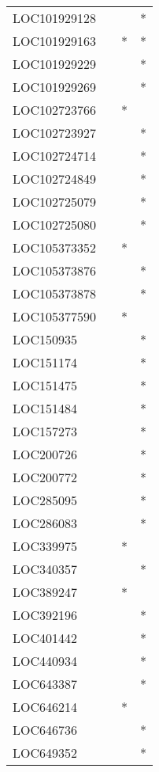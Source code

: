 \begin{longtable}{lccc}
LOC101929128   &       &    &       * \\
LOC101929163   &       &  * &       * \\
LOC101929229   &       &    &       * \\
LOC101929269   &       &    &       * \\
LOC102723766   &       &  * &         \\
LOC102723927   &       &    &       * \\
LOC102724714   &       &    &       * \\
LOC102724849   &       &    &       * \\
LOC102725079   &       &    &       * \\
LOC102725080   &       &    &       * \\
LOC105373352   &       &  * &         \\
LOC105373876   &       &    &       * \\
LOC105373878   &       &    &       * \\
LOC105377590   &       &  * &         \\
LOC150935      &       &    &       * \\
LOC151174      &       &    &       * \\
LOC151475      &       &    &       * \\
LOC151484      &       &    &       * \\
LOC157273      &       &    &       * \\
LOC200726      &       &    &       * \\
LOC200772      &       &    &       * \\
LOC285095      &       &    &       * \\
LOC286083      &       &    &       * \\
LOC339975      &       &  * &         \\
LOC340357      &       &    &       * \\
LOC389247      &       &  * &         \\
LOC392196      &       &    &       * \\
LOC401442      &       &    &       * \\
LOC440934      &       &    &       * \\
LOC643387      &       &    &       * \\
LOC646214      &       &  * &         \\
LOC646736      &       &    &       * \\
LOC649352      &       &    &       * \\

\end{longtable}
